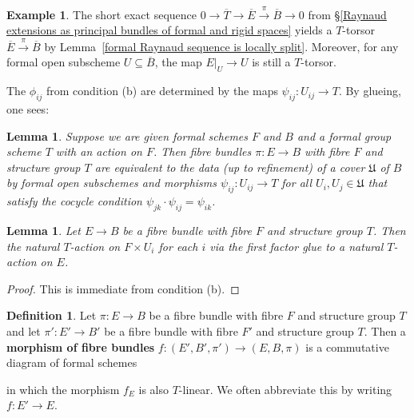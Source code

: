\documentclass[10pt,oneside]{amsart}
\newtheorem{lemma}[theorem]{Lemma}
\theoremstyle{definition}
\newtheorem{definition}[theorem]{Definition}
\newtheorem{example}[theorem]{Example}
\begin{document}
	\begin{example}
		The short exact sequence $0\rightarrow \overline{T}\rightarrow \overline{E}\xrightarrow{\pi} \overline{B}\rightarrow 0$ from \S\ref{Raynaud extensions as principal bundles of formal and rigid spaces} yields a $T$-torsor $\overline{E}\xrightarrow{\pi} \overline{B}$ by Lemma~\ref{formal Raynaud sequence is locally split}. Moreover, for any formal open subscheme $U\subseteq \overline{B}$, the map $E|_U\rightarrow U$ is still a $T$-torsor.
	\end{example}
	
	The $\phi_{ij}$ from condition (b) are determined by the maps $\psi_{ij}:U_{ij}\rightarrow T$. By glueing, one sees:
	\begin{lemma}\label{equivalent characterisation of principal $T$-bundle}
		Suppose we are given formal schemes $F$ and $B$ and a formal group scheme $T$ with an action on $F$. Then fibre bundles $\pi:E\rightarrow B$ with fibre $F$ and structure group $T$ are equivalent to the data (up to refinement) of a cover $\mathfrak U$ of $B$ by formal open subschemes and morphisms $\psi_{ij}:U_{ij}\rightarrow T$ for all $U_i,U_j\in \mathfrak U$ that satisfy the cocycle condition $\psi_{jk}\cdot \psi_{ij}=\psi_{ik}$.
	\end{lemma}
	\begin{lemma}
		Let $E\rightarrow B$ be a fibre bundle with fibre $F$ and structure group $T$. Then the natural $T$-action on $F\times U_{i}$ for each $i$ via the first factor glue to a natural $T$-action on $E$.
	\end{lemma}
	\begin{proof}
		This is immediate from condition (b).
	\end{proof}
	\begin{definition}
		Let $\pi:E\rightarrow B$ be a fibre bundle with fibre $F$ and structure group $T$ and let $\pi':E'\rightarrow B'$ be a fibre bundle with fibre $F'$ and structure group $T$. Then a \textbf{morphism of fibre bundles} $f:(E',B',\pi')\rightarrow (E,B,\pi)$ is a commutative diagram of formal schemes
		\begin{center}
		\end{center}
		in which the morphism $f_E$ is also $T$-linear. We often abbreviate this by writing $f:E'\rightarrow E$.
	\end{definition}
	
\end{document}
